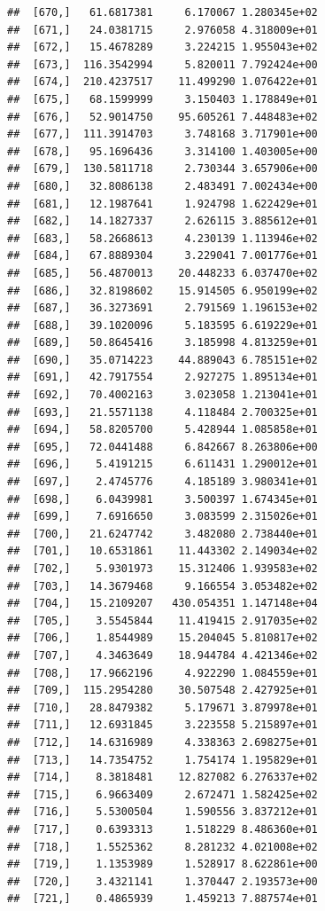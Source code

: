 \documentclass[article]{jss}\usepackage[]{graphicx}\usepackage[]{xcolor}
\makeatletter
\newenvironment{kframe}{%
 \def\at@end@of@kframe{}%
 \ifinner\ifhmode%
  \def\at@end@of@kframe{\end{minipage}}%
  \begin{minipage}{\columnwidth}%
 \fi\fi%
 \def\FrameCommand##1{\hskip\@totalleftmargin \hskip-\fboxsep
 \colorbox{shadecolor}{##1}\hskip-\fboxsep
     \hskip-\linewidth \hskip-\@totalleftmargin \hskip\columnwidth}%
 \MakeFramed {\advance\hsize-\width
   \@totalleftmargin\z@ \linewidth\hsize
   \@setminipage}}%
 {\par\unskip\endMakeFramed%
 \at@end@of@kframe}
\newenvironment{knitrout}{}{} %
\makeatother
\begin{document}
\begin{knitrout}
\begin{kframe}
\begin{verbatim}
##  [670,]   61.6817381     6.170067 1.280345e+02
##  [671,]   24.0381715     2.976058 4.318009e+01
##  [672,]   15.4678289     3.224215 1.955043e+02
##  [673,]  116.3542994     5.820011 7.792424e+00
##  [674,]  210.4237517    11.499290 1.076422e+01
##  [675,]   68.1599999     3.150403 1.178849e+01
##  [676,]   52.9014750    95.605261 7.448483e+02
##  [677,]  111.3914703     3.748168 3.717901e+00
##  [678,]   95.1696436     3.314100 1.403005e+00
##  [679,]  130.5811718     2.730344 3.657906e+00
##  [680,]   32.8086138     2.483491 7.002434e+00
##  [681,]   12.1987641     1.924798 1.622429e+01
##  [682,]   14.1827337     2.626115 3.885612e+01
##  [683,]   58.2668613     4.230139 1.113946e+02
##  [684,]   67.8889304     3.229041 7.001776e+01
##  [685,]   56.4870013    20.448233 6.037470e+02
##  [686,]   32.8198602    15.914505 6.950199e+02
##  [687,]   36.3273691     2.791569 1.196153e+02
##  [688,]   39.1020096     5.183595 6.619229e+01
##  [689,]   50.8645416     3.185998 4.813259e+01
##  [690,]   35.0714223    44.889043 6.785151e+02
##  [691,]   42.7917554     2.927275 1.895134e+01
##  [692,]   70.4002163     3.023058 1.213041e+01
##  [693,]   21.5571138     4.118484 2.700325e+01
##  [694,]   58.8205700     5.428944 1.085858e+01
##  [695,]   72.0441488     6.842667 8.263806e+00
##  [696,]    5.4191215     6.611431 1.290012e+01
##  [697,]    2.4745776     4.185189 3.980341e+01
##  [698,]    6.0439981     3.500397 1.674345e+01
##  [699,]    7.6916650     3.083599 2.315026e+01
##  [700,]   21.6247742     3.482080 2.738440e+01
##  [701,]   10.6531861    11.443302 2.149034e+02
##  [702,]    5.9301973    15.312406 1.939583e+02
##  [703,]   14.3679468     9.166554 3.053482e+02
##  [704,]   15.2109207   430.054351 1.147148e+04
##  [705,]    3.5545844    11.419415 2.917035e+02
##  [706,]    1.8544989    15.204045 5.810817e+02
##  [707,]    4.3463649    18.944784 4.421346e+02
##  [708,]   17.9662196     4.922290 1.084559e+01
##  [709,]  115.2954280    30.507548 2.427925e+01
##  [710,]   28.8479382     5.179671 3.879978e+01
##  [711,]   12.6931845     3.223558 5.215897e+01
##  [712,]   14.6316989     4.338363 2.698275e+01
##  [713,]   14.7354752     1.754174 1.195829e+01
##  [714,]    8.3818481    12.827082 6.276337e+02
##  [715,]    6.9663409     2.672471 1.582425e+02
##  [716,]    5.5300504     1.590556 3.837212e+01
##  [717,]    0.6393313     1.518229 8.486360e+01
##  [718,]    1.5525362     8.281232 4.021008e+02
##  [719,]    1.1353989     1.528917 8.622861e+00
##  [720,]    3.4321141     1.370447 2.193573e+00
##  [721,]    0.4865939     1.459213 7.887574e+01

\end{verbatim}
\end{kframe}
\end{knitrout}
\end{document}
